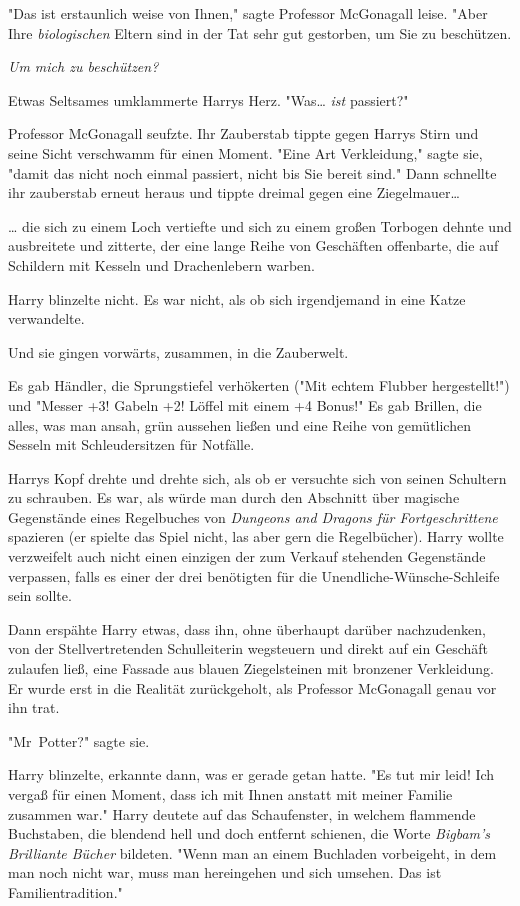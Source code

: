 {"Das ist erstaunlich weise von Ihnen," sagte Professor McGonagall leise. "Aber Ihre \emph{biologischen} Eltern sind in der Tat sehr gut gestorben, um Sie zu beschützen.

\emph{Um mich zu beschützen?}

Etwas Seltsames umklammerte Harrys Herz. "Was… \emph{ist} passiert?"

Professor McGonagall seufzte. Ihr Zauberstab tippte gegen Harrys Stirn und seine Sicht verschwamm für einen Moment. "Eine Art Verkleidung," sagte sie, "damit das nicht noch einmal passiert, nicht bis Sie bereit sind." Dann schnellte ihr zauberstab erneut heraus und tippte dreimal gegen eine Ziegelmauer…

… die sich zu einem Loch vertiefte und sich zu einem großen Torbogen dehnte und ausbreitete und zitterte, der eine lange Reihe von Geschäften offenbarte, die auf Schildern mit Kesseln und Drachenlebern warben.

Harry blinzelte nicht. Es war nicht, als ob sich irgendjemand in eine Katze verwandelte.

Und sie gingen vorwärts, zusammen, in die Zauberwelt.

Es gab Händler, die Sprungstiefel verhökerten ("Mit echtem Flubber hergestellt!") und "Messer +3! Gabeln +2! Löffel mit einem +4 Bonus!" Es gab Brillen, die alles, was man ansah, grün aussehen ließen und eine Reihe von gemütlichen Sesseln mit Schleudersitzen für Notfälle.

Harrys Kopf drehte und drehte sich, als ob er versuchte sich von seinen Schultern zu schrauben. Es war, als würde man durch den Abschnitt über magische Gegenstände eines Regelbuches von \emph{Dungeons and Dragons für Fortgeschrittene} spazieren (er spielte das Spiel nicht, las aber gern die Regelbücher). Harry wollte verzweifelt auch nicht einen einzigen der zum Verkauf stehenden Gegenstände verpassen, falls es einer der drei benötigten für die Unendliche-Wünsche-Schleife sein sollte.

Dann erspähte Harry etwas, dass ihn, ohne überhaupt darüber nachzudenken, von der Stellvertretenden Schulleiterin wegsteuern und direkt auf ein Geschäft zulaufen ließ, eine Fassade aus blauen Ziegelsteinen mit bronzener Verkleidung. Er wurde erst in die Realität zurückgeholt, als Professor McGonagall genau vor ihn trat.

"Mr~Potter?" sagte sie.

Harry blinzelte, erkannte dann, was er gerade getan hatte. "Es tut mir leid! Ich vergaß für einen Moment, dass ich mit Ihnen anstatt mit meiner Familie zusammen war." Harry deutete auf das Schaufenster, in welchem flammende Buchstaben, die blendend hell und doch entfernt schienen, die Worte \emph{Bigbam's Brilliante Bücher} bildeten. "Wenn man an einem Buchladen vorbeigeht, in dem man noch nicht war, muss man hereingehen und sich umsehen. Das ist Familientradition."

}

